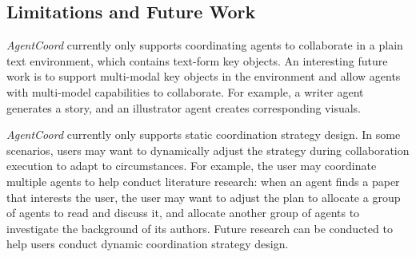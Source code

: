 \subsection{Limitations and Future Work}
\textit{AgentCoord} currently only supports coordinating agents to collaborate in a plain text environment, which contains text-form key objects. An interesting future work is to support multi-modal key objects in the environment and allow agents with multi-model capabilities to collaborate. For example, a writer agent generates a story, and an illustrator agent creates corresponding visuals.

\textit{AgentCoord} currently only supports static coordination strategy design. In some scenarios, users may want to dynamically adjust the strategy during collaboration execution to adapt to circumstances. For example, the user may coordinate multiple agents to help conduct literature research: when an agent finds a paper that interests the user, the user may want to adjust the plan to allocate a group of agents to read and discuss it, and allocate another group of agents to investigate the background of its authors. Future research can be conducted to help users conduct dynamic coordination strategy design.






